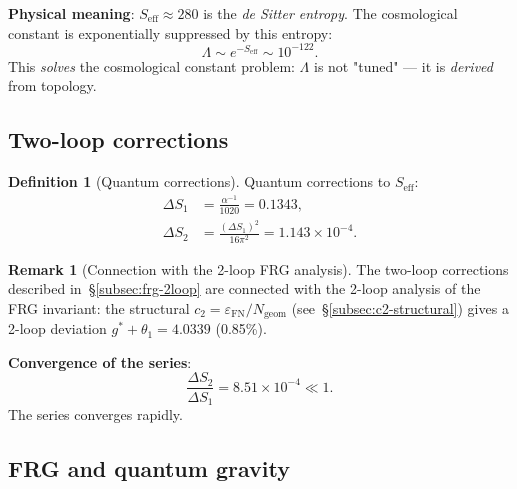 \documentclass[11pt,a4paper]{article}
\newcommand{\epsFN}{\ensuremath{\varepsilon_{\text{FN}}}}
\theoremstyle{definition}
\newtheorem{definition}[theorem]{Definition}
\newtheorem{remark}[theorem]{Remark}
\begin{document}
\medskip\noindent
\textbf{Physical meaning}: $S_{\text{eff}} \approx 280$ is
the \emph{de Sitter entropy}. The cosmological constant
is exponentially suppressed by this entropy:
\begin{equation}
    \Lambda \sim e^{-S_{\text{eff}}} \sim 10^{-122}.
\end{equation}
This \emph{solves} the cosmological constant problem:
$\Lambda$ is not "tuned" --- it is \emph{derived} from topology.

\subsection{Two-loop corrections}
\label{subsec:qg-2loop}

\begin{definition}[Quantum corrections]
\label{def:qg-2loop}
Quantum corrections to $S_{\text{eff}}$:
\begin{align}
    \Delta S_1 &= \frac{\alpha^{-1}}{1020} = 0.1343, \\
    \Delta S_2 &= \frac{(\Delta S_1)^2}{16\pi^2} = 1.143 \times 10^{-4}.
\end{align}
\end{definition}

\begin{remark}[Connection with the 2-loop FRG analysis]
\label{rem:2loop-link}
The two-loop corrections described in~\S\ref{subsec:frg-2loop}
are connected with the 2-loop analysis of the FRG invariant: the structural
$c_2 = \epsFN/N_{\text{geom}}$ (see~\S\ref{subsec:c2-structural})
gives a 2-loop deviation $g^* + \theta_1 = 4.0339$ (0.85\%).
\end{remark}

\medskip\noindent
\textbf{Convergence of the series}:
\begin{equation}
    \frac{\Delta S_2}{\Delta S_1} = 8.51 \times 10^{-4} \ll 1.
\end{equation}
The series converges rapidly.

\subsection{FRG and quantum gravity}
\label{subsec:qg-frg}
\end{document}
